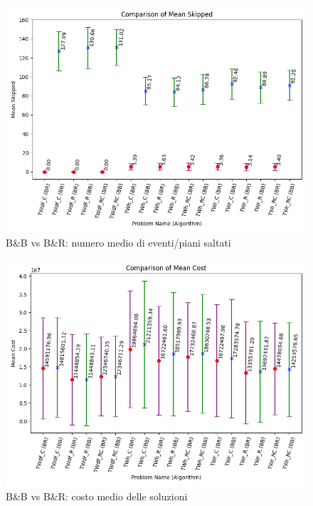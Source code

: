 \documentclass[
    article,            %
    12pt,                %
    oneside,            %
    a4paper,            %
    english,            %
    italian,                %
    sumario=tradicional,
]{abntex2}
\begin{document}
\vspace*{\fill}
\newpage{}
\vspace*{\fill}
\begin{figure}[h!]
    \centering
    \includegraphics[width=1.0\textwidth]{Images/mean_skipped.png}
    \caption{B\&B vs B\&R: numero medio di eventi/piani saltati}
    \label{fig:mean_skipped}
\end{figure}
\vspace*{\fill}
\newpage{}
\vspace*{\fill}
\begin{figure}[h!]
    \centering
    \includegraphics[width=1.0\textwidth]{Images/Mean_cost.png}
    \caption{B\&B vs B\&R: costo medio delle soluzioni}
    \label{fig:Mean_cost}
\end{figure}
\end{document}
